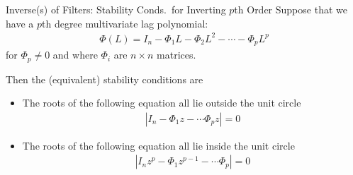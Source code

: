 \documentclass[aspectratio=169, handout]{beamer}
\begin{document}
{\footnotesize
\begin{frame}{Inverse(s) of Filters: Stability Conds.\ for Inverting $p$th Order}
Suppose that we have a $p$th degree \alert{multivariate} lag polynomial:
\begin{align*}
  \Phi(L) = I_n - \Phi_1 L - \Phi_2 L^2 - \cdots - \Phi_p L^p
\end{align*}
for $\Phi_p\neq 0$ and where $\Phi_i$ are $n\times n$ matrices.

\pause
Then the (equivalent) stability conditions are
\begin{itemize}
  \item The roots of the following equation all lie outside the unit
    circle
    \begin{align*}
      |I_n - \Phi_1 z - \cdots \Phi_p z| = 0
    \end{align*}

  \item The roots of the following equation all lie inside the unit
    circle
    \begin{align*}
      |I_nz^p - \Phi_1 z^{p-1} - \cdots \Phi_p| = 0
    \end{align*}
\end{itemize}
\end{frame}
}
\end{document}
